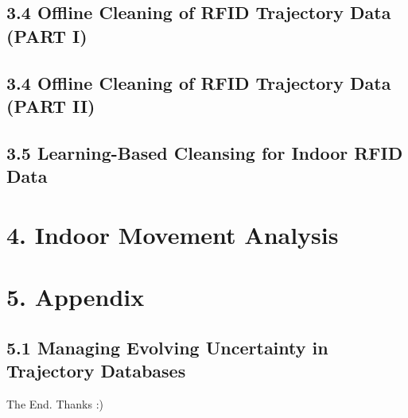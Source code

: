 \documentclass{beamer}
\begin{document}
% 
% 

\subsection{3.4 Offline Cleaning of RFID Trajectory Data (PART I)} %

% 
% 

\subsection{3.4 Offline Cleaning of RFID Trajectory Data (PART II)} %

% 
% 

\subsection{3.5 Learning-Based Cleansing for Indoor RFID Data} %

% 
% 

\section{4. Indoor Movement Analysis} %

\section{5. Appendix} %

\subsection{5.1 Managing Evolving Uncertainty in Trajectory Databases} %





\begin{frame}
\Huge{\centerline{The End. Thanks :)}}
\end{frame}

\end{document}
